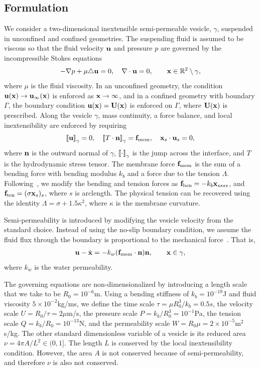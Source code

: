 \documentclass[9pt,twocolumn,twoside,lineno]{pnas-new}
\begin{document}
\subsection*{Formulation}
We consider a two-dimensional inextensible semi-permeable vesicle,
$\gamma$, suspended in unconfined and confined geometries. The
suspending fluid is assumed to be viscous so that the fluid velocity
$\mathbf{u}$ and pressure $p$ are governed by the incompressible Stokes
equations
\begin{align}
  \label{eqn:governing}
  -\nabla p + \mu \triangle \mathbf{u} = 0, \quad
  \nabla \cdot \mathbf{u} = 0, \qquad \mathbf{x} \in \mathbb{R}^2 \setminus \gamma,
\end{align}
where $\mu$ is the fluid viscosity. In an unconfined geometry, the
condition $\mathbf{u}(\mathbf{x}) \rightarrow \mathbf{u}_\infty(\mathbf{x})$ is enforced as $\mathbf{x}
\rightarrow \infty$, and in a confined geometry with boundary $\Gamma$,
the boundary condition $\mathbf{u}(\mathbf{x}) = \mathbf{U}(\mathbf{x})$ is enforced on $\Gamma$,
where $\mathbf{U}(\mathbf{x})$ is prescribed. Along the vesicle $\gamma$, mass
continuity, a force balance, and local inextensibility are enforced by
requiring
\begin{align}
  \label{eqn:jump}
  \left[\!\left[ \mathbf{u} \right]\!\right]_\gamma = 0, \quad
  \left[\!\left[ T\cdot\mathbf{n} \right]\!\right]_\gamma = \mathbf{f}_\mathrm{mem}, \quad
  \mathbf{x}_s \cdot \mathbf{u}_s = 0,
\end{align}
where $\mathbf{n}$ is the outward normal of $\gamma$, $\left[\!\left[ \cdot \right]\!\right]_\gamma$ is the
jump across the interface, and $T$ is the hydrodynamic stress tensor.
The membrane force $\mathbf{f}_\mathrm{mem}$ is the sum of a bending force
with bending modulus $k_b$ and a force due to the tension $\Lambda$.
Following~\cite{vee-gue-zor-bir2009}, we modify the bending and tension
forces as $\mathbf{f}_\mathrm{ben} = -k_b \mathbf{x}_{ssss}$, and $\mathbf{f}_\mathrm{ten} =
(\sigma \mathbf{x}_s)_s$, where $s$ is arclength. The physical tension can be
recovered using the identity $\Lambda = \sigma + 1.5 \kappa^2$, where
$\kappa$ is the membrane curvature.

Semi-permeability is introduced by modifying the vesicle velocity from
the standard choice. Instead of using the no-slip boundary condition, we
assume the fluid flux through the boundary is proportional to the
mechanical force~\cite{yao-mor2017}. That is, 
\begin{align}
  \label{eqn:vesicleFlux}
  \mathbf{u} - \dot{\mathbf{x}} = - k_w (\mathbf{f}_\mathrm{mem} \cdot \mathbf{n}) \mathbf{n}, \qquad
  \mathbf{x} \in \gamma,
\end{align}
where $k_w$ is the water permeability.

The governing equations are non-dimensionalized by introducing a length
scale that we take to be $R_0 = 10^{-6}$m. Using a bending stiffness of
$k_b = 10^{-19}$J and fluid viscosity $5 \times 10^{-2}$kg/ms, we define
the time scale $\tau = \mu R_0^3/k_b = 0.5s$, the velocity scale $U =
R_0/\tau = 2\mu$m/s, the pressure scale $P = k_b/R_0^3 = 10^{-1}$Pa, the
tension scale $Q = k_b/R_0 = 10^{-13}$N, and the permeability scale $W =
R_0\mu = 2 \times 10^{-5}$m$^2$s/kg. The other standard dimensionless
variable of a vesicle is its reduced area $\nu = 4\pi A/L^2 \in (0,1]$.
The length $L$ is conserved by the local inextensibility condition.
However, the area $A$ is not conserved because of semi-permeability, and
therefore $\nu$ is also not conserved.
\end{document}
